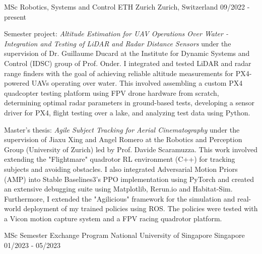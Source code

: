 

\begin{cventries}

  \cventry
    {MSc Robotics, Systems and Control} %
    {ETH Zurich} %
    {Zurich, Switzerland} %
    {09/2022 - present} %
    {
      \begin{cvitems} %
        \item Semester project: \textit{Altitude Estimation for UAV Operations Over Water - Integration and Testing of LiDAR and
        Radar Distance Sensors} under the supervision of Dr. Guillaume Ducard at the Institute for Dynamic Systems and Control (IDSC) group of Prof. Onder. I integrated and tested LiDAR and radar range finders with the goal of achieving reliable altitude measurements for PX4-powered UAVs operating over water. This involved assembling a custom PX4 quadcopter testing platform using FPV drone hardware from scratch, determining optimal radar parameters in ground-based tests, developing a sensor driver for PX4, flight testing over a lake, and analyzing test data using Python.
        \item Master's thesis: \textit{Agile Subject Tracking for Aerial Cinematography} under the supervision of Jiaxu Xing and Angel Romero at the Robotics and Perception Group (University of Zurich) led by Prof. Davide Scaramuzza. This work involved extending the "Flightmare" quadrotor RL environment (C++) for tracking subjects and avoiding obstacles. I also integrated Adversarial Motion Priors (AMP) into Stable Baselines3's PPO implementation using PyTorch and created an extensive debugging suite using Matplotlib, Rerun.io and Habitat-Sim. Furthermore, I extended the "Agilicious" framework for the simulation and real-world deployment of my trained policies using ROS. The policies were tested with a Vicon motion capture system and a FPV racing quadrotor platform.
      \end{cvitems}
    }

  \cventry
  {MSc Semester Exchange Program} %
  {National University of Singapore} %
  {Singapore} %
  {01/2023 - 05/2023} %
  {
  }


\end{cventries}
